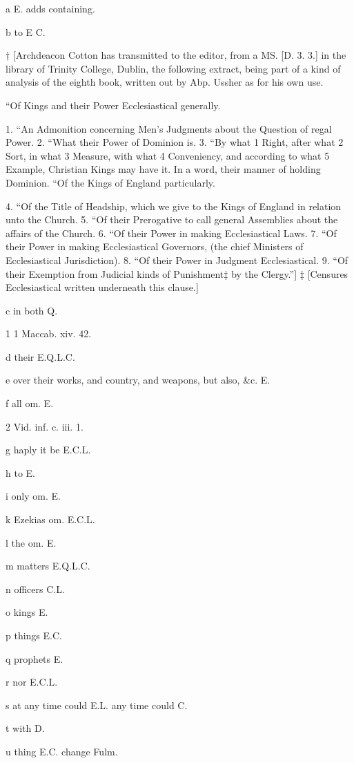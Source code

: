 a
E. adds containing.

b
to E C.

†
[Archdeacon Cotton has transmitted to the editor, from a MS. [D. 3. 3.] in the library of Trinity College, Dublin, the following extract, being part of a kind of analysis of the eighth book, written out by Abp. Ussher as for his own use.

“Of Kings and their Power Ecclesiastical generally.

1. “An Admonition concerning Men’s Judgments about the Question of regal Power.
2. “What their Power of Dominion is.
3. “By what 1 Right, after what 2 Sort, in what 3 Measure, with what 4 Conveniency, and according to what 5 Example, Christian Kings may have it. In a word, their manner of holding Dominion.
“Of the Kings of England particularly.

4. “Of the Title of Headship, which we give to the Kings of England in relation unto the Church.
5. “Of their Prerogative to call general Assemblies about the affairs of the Church.
6. “Of their Power in making Ecclesiastical Laws.
7. “Of their Power in making Ecclesiastical Governors, (the chief Ministers of Ecclesiastical Jurisdiction).
8. “Of their Power in Judgment Ecclesiastical.
9. “Of their Exemption from Judicial kinds of Punishment‡ by the Clergy.”]
‡
[Censures Ecclesiastical written underneath this clause.]

c
in both Q.

1
1 Maccab. xiv. 42.

d
their E.Q.L.C.

e
over their works, and country, and weapons, but also, &c. E.

f
all om. E.

2
Vid. inf. c. iii. 1.

g
haply it be E.C.L.

h
to E.

i
only om. E.

k
Ezekias om. E.C.L.

l
the om. E.

m
matters E.Q.L.C.

n
officers C.L.

o
kings E.

p
things E.C.

q
prophets E.

r
nor E.C.L.

s
at any time could E.L. any time could C.

t
with D.

u
thing E.C. change Fulm.

